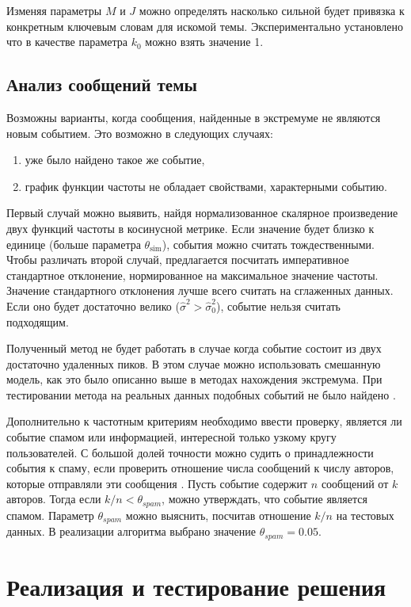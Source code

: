 \documentclass[14pt,a4paper,oneside]{extarticle}
\DeclareMathOperator{\simu}{sim}
\begin{document}
  Изменяя параметры $M$ и $J$ можно определять насколько сильной будет привязка к конкретным ключевым словам для искомой темы. Экспериментально установлено что в качестве параметра $k_0$ можно взять значение 1.
  
  \subsection{Анализ сообщений темы}
  Возможны варианты, когда сообщения, найденные в экстремуме не являются новым событием. Это возможно в следующих случаях:
  \begin{enumerate}
  \item уже было найдено такое же событие,
  \item график функции частоты не обладает свойствами, характерными событию.
  \end{enumerate}
  
  Первый случай можно выявить, найдя нормализованное скалярное произведение двух функций частоты в косинусной метрике. Если значение будет близко к единице (больше параметра $\theta_{\simu}$), события можно считать тождественными. Чтобы различать второй случай, предлагается посчитать императивное стандартное отклонение, нормированное на максимальное значение частоты. Значение стандартного отклонения лучше всего считать на сглаженных данных. Если оно будет достаточно велико ($\hat{\sigma}^2 > \hat{\sigma}^2_0$), событие нельзя считать подходящим.  
  
  Полученный метод не будет работать в случае когда событие состоит из двух достаточно удаленных пиков. В этом случае можно использовать смешанную модель, как это было описанно выше в методах нахождения экстремума. При тестировании метода на реальных данных подобных событий не было найдено \cite{blei-sd}.
  
  Дополнительно к частотным критериям необходимо ввести проверку, является ли событие спамом или информацией, интересной только узкому кругу пользователей. С большой долей точности можно судить о принадлежности события к спаму, если проверить отношение числа сообщений к числу авторов, которые отправляли эти сообщения \cite{fsd}. Пусть событие содержит $n$ сообщений от $k$ авторов. Тогда если $k/n<\theta_{spam}$, можно утверждать, что событие является спамом. Параметр $\theta_{spam}$ можно выяснить, посчитав отношение $k/n$ на тестовых данных. В реализации алгоритма выбрано значение $\theta_{spam}=0.05$.
  

  \section{Реализация и тестирование решения}
  
\end{document}
